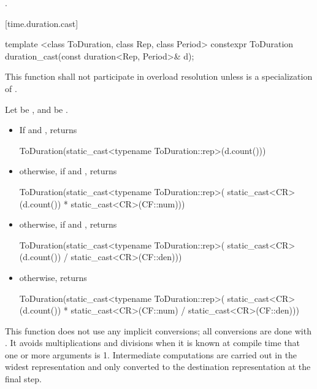 \begin{itemdescr}
\pnum
\returns {}.
\end{itemdescr}

[time.duration.cast]{}

%
%
\begin{itemdecl}
template <class ToDuration, class Rep, class Period>
  constexpr ToDuration duration_cast(const duration<Rep, Period>& d);
\end{itemdecl}

\begin{itemdescr}
\pnum
\remarks This function shall not participate in overload resolution
unless  is a specialization of .

\pnum
\returns Let  be , and  be  .
\begin{itemize}
\item If  and , returns
\begin{codeblock}
ToDuration(static_cast<typename ToDuration::rep>(d.count()))
\end{codeblock}

\item otherwise, if  and , returns
\begin{codeblock}
ToDuration(static_cast<typename ToDuration::rep>(
  static_cast<CR>(d.count()) * static_cast<CR>(CF::num)))
\end{codeblock}

\item otherwise, if  and , returns
\begin{codeblock}
ToDuration(static_cast<typename ToDuration::rep>(
  static_cast<CR>(d.count()) / static_cast<CR>(CF::den)))
\end{codeblock}

\item otherwise, returns
\begin{codeblock}
ToDuration(static_cast<typename ToDuration::rep>(
  static_cast<CR>(d.count()) * static_cast<CR>(CF::num) / static_cast<CR>(CF::den)))
\end{codeblock}
\end{itemize}

\pnum
\begin{note}
This function does not use any implicit conversions; all conversions
are done with . It avoids multiplications and divisions when
it is known at compile time that one or more arguments is 1. Intermediate
computations are carried out in the widest representation and only converted to
the destination representation at the final step.
\end{note}
\end{itemdescr}

